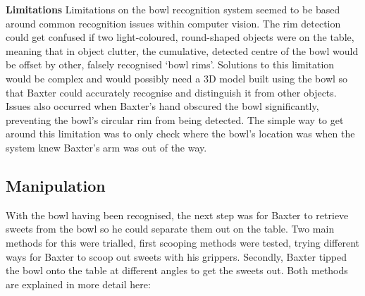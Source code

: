 \newline\newline
\textbf{Limitations}\newline
Limitations on the bowl recognition system seemed to be based around common recognition issues within computer vision. The rim detection could get confused if two light-coloured, round-shaped objects were on the table, meaning that in object clutter, the cumulative, detected centre of the bowl would be offset by other, falsely recognised `bowl rims'. Solutions to this limitation would be complex and would possibly need a 3D model built using the bowl so that Baxter could accurately recognise and distinguish it from other objects. Issues also occurred when Baxter's hand obscured the bowl significantly, preventing the bowl's circular rim from being detected. The simple way to get around this limitation was to only check where the bowl's location was when the system knew Baxter's arm was out of the way.
\subsection{Manipulation}
With the bowl having been recognised, the next step was for Baxter to retrieve sweets from the bowl so he could separate them out on the table. Two main methods for this were trialled, first scooping methods were tested, trying different ways for Baxter to scoop out sweets with his grippers. Secondly, Baxter tipped the bowl onto the table at different angles to get the sweets out. Both methods are explained in more detail here:
